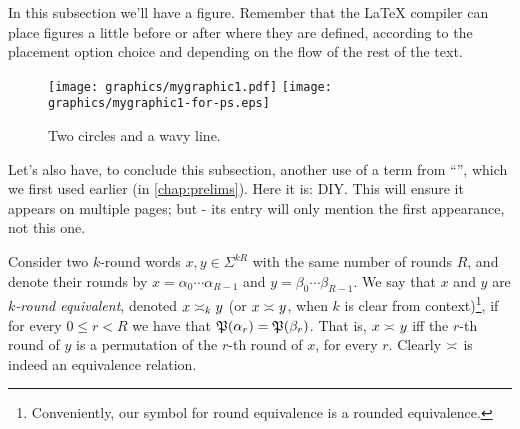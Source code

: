 In this subsection we'll have a figure. Remember that the {\LaTeX} compiler can place figures a little before or after where they are defined, according to the placement option choice and depending on the flow of the rest of the text.

\begin{figure}[htb]
  \centering
  \ifpdf
    \texttt{[image: graphics/mygraphic1.pdf]}
  \else
    \texttt{[image: graphics/mygraphic1-for-ps.eps]}
  \fi
  \caption{Two circles and a wavy line.}
\end{figure}

Let's also have, to conclude this subsection, another use of a term from ``'', which we first used earlier (in \autoref{chap:prelims}). Here it is: \gls{DIY}. This will ensure it appears on multiple pages; but - its entry will only mention the first appearance, not this one.

\label{sec:round-equivalence}
Consider two $k$-round words $x,y\in \Sigma^{kR}$ with the same number of rounds $R$, and denote their rounds by $x=\alpha_0\cdots \alpha_{R-1}$ and $y=\beta_0\cdots \beta_{R-1}$. We say that $x$ and $y$ are \emph{$k$-round equivalent}, denoted $x\req[k] y$ (or $x\req y$, when $k$ is clear from context)\footnote{Conveniently, our symbol for round equivalence is a rounded equivalence.}, if for every $0\le r<R$ we have that $\fP(\alpha_r)=\fP(\beta_r)$. That is, $x\req y$ iff the $r$-th round of $y$ is a permutation of the $r$-th round of $x$, for every $r$. Clearly $\req$ is indeed an equivalence relation.

